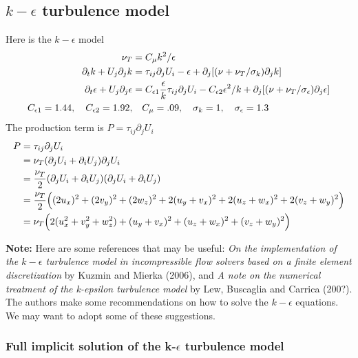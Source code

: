 \clearpage
\newcommand{\eps}{\epsilon}
\subsection{$k-\epsilon$ turbulence model}

Here is the $k-\epsilon$ model
\begin{align*}
   \nu_T &= C_\mu k^2/\eps \\
   \partial_t k + U_j\partial_j k & = \tau_{ij} \partial_j U_i -\eps
                    + \partial_j[ (\nu+\nu_T/\sigma_k)\partial_j k] \\
    \partial_t \eps + U_j\partial_j \eps  &= C_{\eps 1} {\eps\over k}\tau_{ij} \partial_j U_i 
           -C_{\eps 2} \eps^2/k +  \partial_j[ (\nu+\nu_T/\sigma_\eps)\partial_j \eps] \\  
   C_{\eps 1}=1.44, \quad C_{\eps 2}=1.92, &\quad C_\mu = .09, \quad \sigma_k=1, \quad \sigma_\eps=1.3
\end{align*}
The production term is $P=\tau_{ij} \partial_j U_i$
\begin{align*}
  P & =\tau_{ij} \partial_j U_i \\
    & = \nu_T( \partial_j U_i + \partial_i U_j) \partial_j U_i \\
    & = {\nu_T\over2} ( \partial_j U_i + \partial_i U_j)( \partial_j U_i + \partial_i U_j) \\
    & = {\nu_T\over2} \Big( (2 u_x)^2 + (2 v_y)^2+ (2 w_z)^2+ 2 (u_y+v_x)^2 + 2 (u_z+w_x)^2  + 2 (v_z+w_y)^2  \Big) \\
    & = \nu_T\Big( 2( u_x^2 + v_y^2+ w_z^2 )+ (u_y+v_x)^2 + (u_z+w_x)^2  + (v_z+w_y)^2  \Big)
\end{align*}


{\bf Note:} Here are some references that may be useful: {\em On the implementation of the $k-\eps$ turbulence model in incompressible
         flow solvers based on a finite element discretization} by Kuzmin and Mierka (2006),
  and {\em A note on the numerical treatment of the k-epsilon turbulence model} by Lew, Buscaglia and Carrica (200?).
The authors make some recommendations on how to solve the $k-\epsilon$ equations.
We may want to adopt some of these suggestions.


\subsubsection{Full implicit solution of the k-$\eps$ turbulence model}

